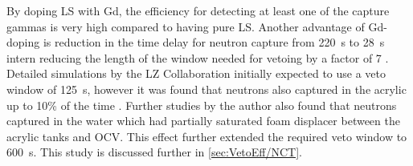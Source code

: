By doping LS with Gd, the efficiency for detecting at least one of the capture gammas is very high compared to having pure LS. Another advantage of Gd-doping is reduction in the time delay for neutron capture from 220~\textmu s to 28~\textmu s intern reducing the length of the window needed for vetoing by a factor of 7 \cite{LZTDR}. Detailed simulations by the LZ Collaboration initially expected to use a veto window of 125~\textmu s, however it was found that neutrons also captured in the acrylic up to 10\% of the time \cite{LZTDR}. Further studies by the author also found that neutrons captured in the water which had partially saturated foam displacer between the acrylic tanks and OCV. This effect further extended the required veto window to 600~\textmu s. This study is discussed further in \autoref{sec:VetoEff/NCT}.

